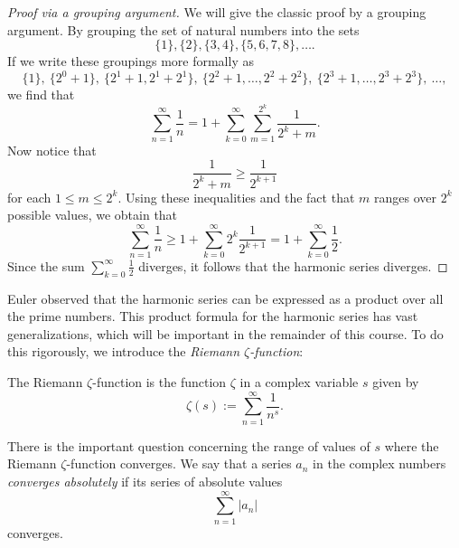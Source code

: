 \begin{proof}[Proof via a grouping argument]
  We will give the classic proof by a grouping argument. By grouping the set of natural numbers into the sets
  \begin{equation*}
    \{1\},\{2\},\{3,4\},\{5,6,7,8\},\ldots.
  \end{equation*}
  If we write these groupings more formally as
  \begin{equation*}
    \{1\},~\{2^0+1\},~\{2^1+1,2^1+2^1\},~\{2^2+1,\ldots,2^2+2^2\},~\{2^3+1,\ldots,2^3+2^3\},~\ldots,
  \end{equation*}
  we find that
  \begin{equation*}
    \sum_{n=1}^{\infty}\frac{1}{n}=1+\sum_{k=0}^\infty\sum_{m=1}^{2^{k}}\frac{1}{2^k+m}.
  \end{equation*}
  Now notice that
  \begin{equation*}
    \frac{1}{2^k+m}\geq \frac{1}{2^{k+1}}
  \end{equation*}
  for each $1\leq m\leq 2^k$. Using these inequalities and the fact that $m$ ranges over $2^k$ possible values, we obtain that
  \begin{equation*}
    \sum_{n=1}^{\infty}\frac{1}{n} \geq 1+\sum_{k=0}^\infty 2^k\frac{1}{2^{k+1}}=1+\sum_{k=0}^\infty\frac{1}{2}.
  \end{equation*}
  Since the sum $\sum_{k=0}^\infty\frac{1}{2}$ diverges, it follows that the harmonic series diverges.
\end{proof}

Euler observed that the harmonic series can be expressed as a product over all the prime numbers. This product formula for the harmonic series has vast generalizations, which will be important in the remainder of this course. To do this rigorously, we introduce the \emph{Riemann $\zeta$-function}:

\begin{definition}
  The Riemann $\zeta$-function is the function $\zeta$ in a complex variable $s$ given by
  \begin{equation*}
    \zeta(s) := \sum_{n=1}^\infty\frac{1}{n^s}.
  \end{equation*}
\end{definition}

There is the important question concerning the range of values of $s$ where the Riemann $\zeta$-function converges. We say that a series $a_n$ in the complex numbers \emph{converges absolutely} if its series of absolute values
\begin{equation*}
  \sum_{n=1}^\infty |a_n|
\end{equation*}
converges.

